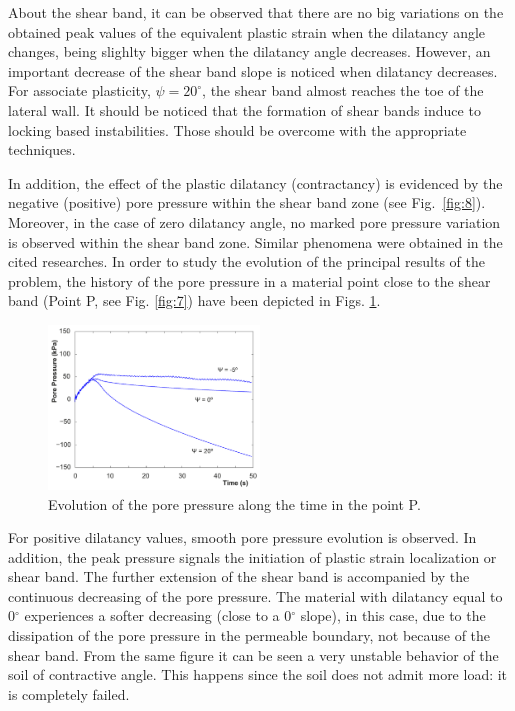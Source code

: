 \documentclass[twocolumn]{svjour3}          %
\begin{document}
About the shear band, it can be observed that there are no big  variations on  the obtained peak values of the equivalent plastic strain when the dilatancy angle changes, being slighlty bigger when the dilatancy angle decreases. However, an important decrease of the shear band slope is noticed when dilatancy decreases. For associate plasticity, $\psi=20^\circ$, the shear band almost reaches the toe of the lateral wall. It should be noticed that the formation of shear bands induce to locking based instabilities. Those should be overcome with the appropriate techniques.

In addition, the effect of the plastic dilatancy (contractancy) is evidenced by the negative (positive) pore pressure within the shear band zone (see Fig.~\ref{fig:8}).  Moreover, in the case of zero dilatancy angle, no marked pore pressure variation is observed within the shear band zone. Similar phenomena were obtained in the cited researches. In order to study the evolution of the principal results of the problem, the history of the pore pressure  in a material point close to the shear band (Point P, see Fig. \ref{fig:7}) have been depicted in Figs. \ref{fig:13}.

\begin{figure}
  \includegraphics[width=0.5\textwidth]{Fig/pressure.pdf}
\caption{Evolution of the pore pressure along the time in the point P.}
\label{fig:13}      
\end{figure}

For positive dilatancy values, smooth pore pressure evolution is observed. In addition, the peak pressure signals the initiation of plastic strain localization or shear band. The further extension of the shear band is accompanied by the continuous decreasing of the pore pressure. The material with dilatancy equal to 0$^\circ$ experiences a softer decreasing (close to a 0$^\circ$ slope), in this case, due to the dissipation of the pore pressure in the permeable boundary, not because of the shear band. From the same figure it can be seen a very unstable behavior of the soil of contractive angle. This happens since the soil does not admit more load: it is completely failed.
\end{document}
